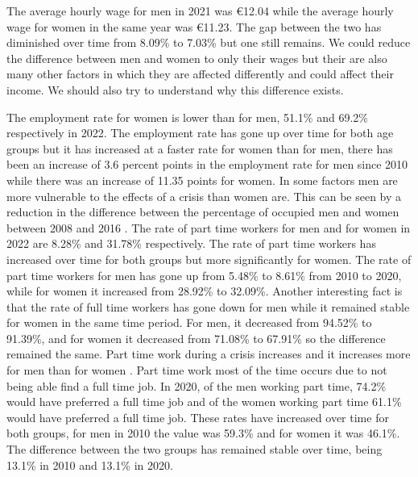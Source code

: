 \documentclass[12pt]{article}
\begin{document}
\begin{spacing}{1.5}

The average hourly wage for men in 2021 was €12.04 while the average hourly wage for women in the same year was €11.23. The gap between the two has diminished over time from 8.09\% to 7.03\% but one still remains. We could reduce the difference between men and women to only their wages but their are also many other factors in which they are affected differently and could affect their income. We should also try to understand why this difference exists.

The employment rate for women is lower than for men, 51.1\% and 69.2\% respectively in 2022. The employment rate has gone up over time for both age groups but it has increased at a faster rate for women than for men, there has been an increase of 3.6 percent points in the employment rate for men since 2010 while there was an increase of 11.35 points for women. In some factors men are more vulnerable to the effects of a crisis than women are. This can be seen by a reduction in the difference between the percentage of occupied men and women between 2008 and 2016 \cite{canal2018punto}. The rate of part time workers for men and for women in 2022 are 8.28\% and 31.78\% respectively. The rate of part time workers has increased over time for both groups but more significantly for women. The rate of part time workers for men has gone up from 5.48\% to 8.61\% from 2010 to 2020, while for women it increased from 28.92\% to 32.09\%. Another interesting fact is that the rate of full time workers has gone down for men while it remained stable for women in the same time period. For men, it decreased from 94.52\% to 91.39\%, and for women it decreased from 71.08\% to 67.91\% so the difference remained the same. Part time work during a crisis increases and it increases more for men than for women \cite{canal2018punto}. Part time work most of the time occurs due to not being able find a full time job. In 2020, of the men working part time, 74.2\% would have preferred a full time job and of the women working part time 61.1\% would have preferred a full time job. These rates have increased over time for both groups, for men in 2010 the value was 59.3\% and for women it was 46.1\%. The difference between the two groups has remained stable over time, being 13.1\% in 2010 and 13.1\% in 2020.


\end{spacing}
\end{document}
